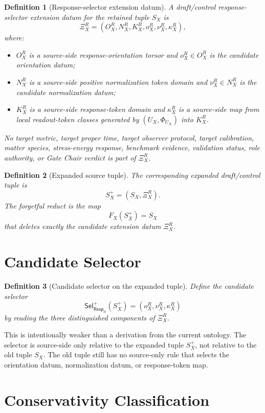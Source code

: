 \documentclass[11pt]{article}
\newcommand{\RespLC}{\mathsf{Resp}_{\mathrm{lc}}}
\newcommand{\SelResp}{\mathsf{Sel}_{\RespLC}}
\newcommand{\XiR}{\Xi_X^R}
\newcommand{\SX}{S_X}
\newcommand{\Splus}{S_X^+}
\newtheorem{definition}{Definition}
\begin{document}
\begin{definition}[Response-selector extension datum]
A draft/control response-selector extension datum for the retained
tuple \(\SX\) is
\[
  \XiR=(O_X^R,N_X^R,K_X^R,o_X^R,\nu_X^R,\kappa_X^R),
\]
where:
\begin{itemize}
  \item \(O_X^R\) is a source-side response-orientation torsor and
  \(o_X^R\in O_X^R\) is the candidate orientation datum;
  \item \(N_X^R\) is a source-side positive normalization token domain
  and \(\nu_X^R\in N_X^R\) is the candidate normalization datum;
  \item \(K_X^R\) is a source-side response-token domain and
  \(\kappa_X^R\) is a source-side map from local readout-token classes
  generated by \((U_X,\Phi_{U_X})\) into \(K_X^R\).
\end{itemize}
No target metric, target proper time, target observer protocol, target
calibration, matter species, stress-energy response, benchmark evidence,
validation status, role authority, or Gate Chair verdict is part of
\(\XiR\).
\end{definition}

\begin{definition}[Expanded source tuple]
The corresponding expanded draft/control tuple is
\[
  \Splus=(\SX,\XiR).
\]
The forgetful reduct is the map
\[
  F_X(\Splus)=\SX
\]
that deletes exactly the candidate extension datum \(\XiR\).
\end{definition}

\section{Candidate Selector}

\begin{definition}[Candidate selector on the expanded tuple]
Define the candidate selector
\[
  \SelResp^{+}(\Splus)=(o_X^R,\nu_X^R,\kappa_X^R)
\]
by reading the three distinguished components of \(\XiR\).
\end{definition}

This is intentionally weaker than a derivation from the current
ontology. The selector is source-side only relative to the expanded
tuple \(\Splus\), not relative to the old tuple \(\SX\). The old tuple
still has no source-only rule that selects the orientation datum,
normalization datum, or response-token map.

\section{Conservativity Classification}
\end{document}
